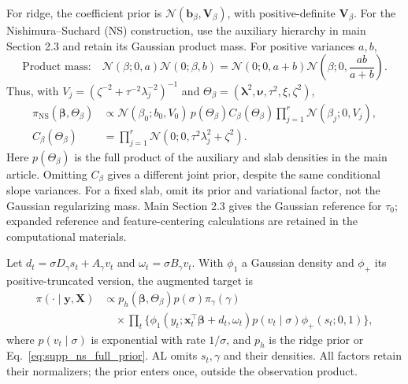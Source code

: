 \documentclass[12pt,letterpaper]{article}
\newcommand{\vect}[1]{\bm{#1}}
\newcommand{\mat}[1]{\bm{#1}}
\newcommand{\Normal}{\mathcal{N}}
\numberwithin{suppalgorithm}{section}
\numberwithin{equation}{section}
\numberwithin{table}{section}
\numberwithin{figure}{section}
\begin{document}
For ridge, the coefficient prior is
\(\Normal(\vect b_\beta,\mat V_\beta)\), with positive-definite
\(\mat V_\beta\). For the Nishimura--Suchard (NS) construction, use the
auxiliary hierarchy in main Section 2.3 and retain its Gaussian product
mass. For positive variances \(a,b\),
\begin{equation}
\text{Product mass:}\quad
\Normal(\beta;0,a)\Normal(0;\beta,b)
=\Normal(0;0,a+b)\Normal\!\left(\beta;0,\frac{ab}{a+b}\right).
\label{eq:supp_ns_product_factor}
\end{equation}
Thus, with \(V_j=(\zeta^{-2}+\tau^{-2}\lambda_j^{-2})^{-1}\) and
\(\Theta_\beta=(\vect\lambda^2,\vect\nu,\tau^2,\xi,\zeta^2)\),
\begin{equation}
\begin{aligned}
\pi_{\mathrm{NS}}(\vect\beta,\Theta_\beta)
&\propto\Normal(\beta_0;b_0,V_0)\,p(\Theta_\beta)
 C_\beta(\Theta_\beta)\prod_{j=1}^r\Normal(\beta_j;0,V_j),\\
C_\beta(\Theta_\beta)
&=\prod_{j=1}^r\Normal(0;0,\tau^2\lambda_j^2+\zeta^2).
\end{aligned}
\label{eq:supp_ns_full_prior}
\end{equation}
Here \(p(\Theta_\beta)\) is the full product of the auxiliary and slab
densities in the main article. Omitting \(C_\beta\) gives a different
joint prior, despite the same conditional slope variances. For a fixed
slab, omit its prior and variational factor, not the Gaussian regularizing
mass. Main Section 2.3 gives the Gaussian reference for \(\tau_0\);
expanded reference and feature-centering calculations are retained in the
computational materials.

Let \(d_t=\sigma D_\gamma s_t+A_\gamma v_t\) and
\(\omega_t=\sigma B_\gamma v_t\). With \(\phi_1\) a Gaussian density
and \(\phi_+\) its positive-truncated version, the augmented target is
\begin{equation}
\begin{aligned}
\pi(\cdot\mid\vect y,\mat X)&\propto
 p_h(\vect\beta,\Theta_\beta)p(\sigma)\pi_\gamma(\gamma)\\
&\quad\times\prod_t\{
 \phi_1(y_t;\vect x_t^\top\vect\beta+d_t,\omega_t)
 p(v_t\mid\sigma)\phi_+(s_t;0,1)\},
\end{aligned}
\label{eq:supp-generic-augmented-target}
\end{equation}
where \(p(v_t\mid\sigma)\) is exponential with rate \(1/\sigma\), and
\(p_h\) is the ridge prior or Eq.~\eqref{eq:supp_ns_full_prior}.
AL omits \(s_t,\gamma\) and their densities. All factors retain their
normalizers; the prior enters once, outside the observation product.
\end{document}
